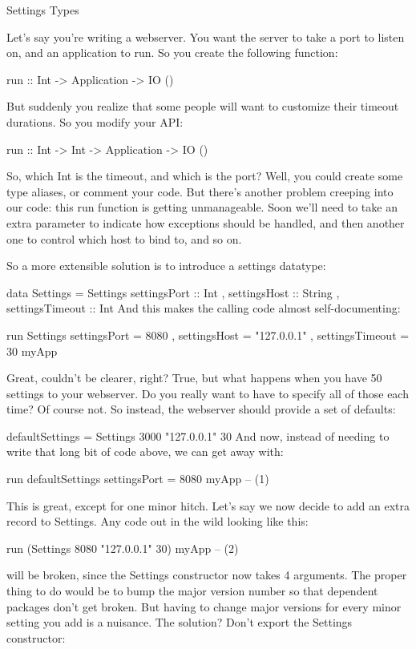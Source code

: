 Settings Types

Let's say you're writing a webserver. You want the server to take a port to listen on, and an
application to run. So you create the following function:

run :: Int -> Application -> IO ()

But suddenly you realize that some people will want to customize their timeout durations. So
you modify your API:

run :: Int -> Int -> Application -> IO ()

So, which Int is the timeout, and which is the port? Well, you could create
some type aliases, or comment your code. But there's another problem creeping into our code: this
run function is getting unmanageable. Soon we'll need to take an extra
parameter to indicate how exceptions should be handled, and then another one to control which
host to bind to, and so on.

So a more extensible solution is to introduce a settings datatype:

data Settings = Settings
    { settingsPort :: Int
    , settingsHost :: String
    , settingsTimeout :: Int
    }
And this makes the calling code almost self-documenting:

run Settings
    { settingsPort = 8080
    , settingsHost = "127.0.0.1"
    , settingsTimeout = 30
    } myApp

Great, couldn't be clearer, right? True, but what happens when you have 50 settings to your
webserver. Do you really want to have to specify all of those each time? Of course not. So
instead, the webserver should provide a set of defaults:

defaultSettings = Settings 3000 "127.0.0.1" 30
And now, instead of needing to write that long bit of code above, we can get away with:

run defaultSettings { settingsPort = 8080 } myApp -- (1)

This is great, except for one minor hitch. Let's say we now decide to add an extra record to
Settings. Any code out in the wild looking like this:

run (Settings 8080 "127.0.0.1" 30) myApp -- (2)

will be broken, since the Settings constructor now takes 4 arguments. The proper
thing to do would be to bump the major version number so that dependent packages don't get
broken. But having to change major versions for every minor setting you add is a nuisance. The
solution? Don't export the Settings constructor:

